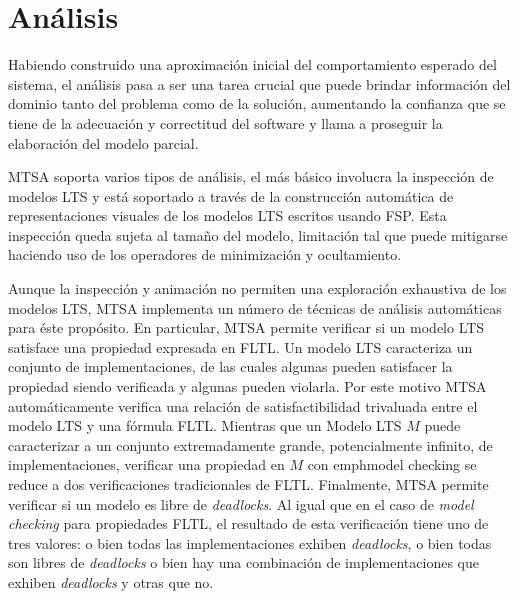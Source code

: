 \section{Análisis}

Habiendo construido una aproximación inicial del comportamiento esperado del sistema, el análisis pasa a ser una tarea
crucial que puede brindar información del dominio tanto del problema como de la solución, aumentando la confianza que se
tiene de la adecuación y correctitud del software y llama a proseguir la elaboración del modelo parcial. 

MTSA soporta varios tipos de análisis, el más básico involucra la inspección de modelos LTS y está soportado a través de
la construcción automática de representaciones visuales de los modelos LTS escritos usando FSP. Esta inspección queda
sujeta al tamaño del modelo, limitación tal que puede mitigarse haciendo uso de los operadores de minimización y
ocultamiento.

Aunque la inspección y animación no permiten una exploración exhaustiva de los modelos LTS, MTSA implementa un número de
técnicas de análisis automáticas para éste propósito. En particular, MTSA permite verificar si un modelo LTS satisface
una propiedad expresada en FLTL. Un modelo LTS caracteriza un conjunto de implementaciones, de las cuales algunas pueden
satisfacer la propiedad siendo verificada y algunas pueden violarla. Por este motivo MTSA automáticamente verifica una
relación de satisfactibilidad trivaluada entre el modelo LTS y una fórmula FLTL. Mientras que un Modelo LTS $M$ puede
caracterizar a un conjunto extremadamente grande, potencialmente infinito, de implementaciones, verificar una propiedad
en $M$ con emph{model checking} se reduce a dos verificaciones tradicionales de FLTL. Finalmente, MTSA permite verificar si un
modelo es libre de \emph{deadlocks}. Al igual que en el caso de \emph{model checking} para propiedades FLTL, el
resultado de esta verificación tiene uno de tres valores: o bien todas las implementaciones exhiben \emph{deadlocks}, o
bien todas son libres de \emph{deadlocks} o bien hay una combinación de implementaciones que exhiben \emph{deadlocks} y
otras que no.
